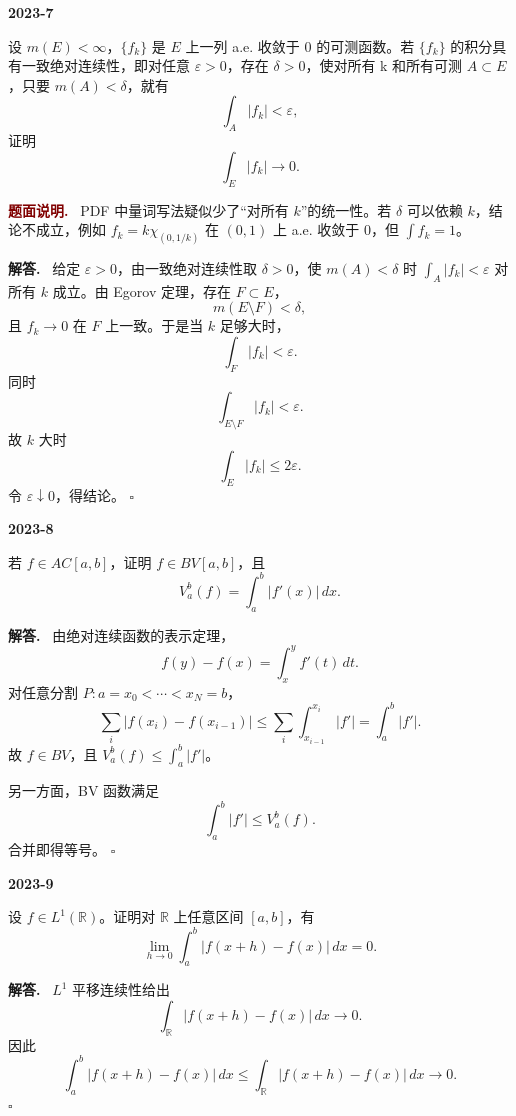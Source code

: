 \documentclass[UTF8]{ctexart}
\newcommand{\R}{\mathbb R}
\newcommand{\eps}{\varepsilon}
\newenvironment{problem}[1]{\par\medskip\noindent\textbf{#1}\par\smallskip}{\par}
\newenvironment{solution}{\par\noindent\textbf{解答.}\ }{\hfill$\square$\par\medskip}
\newenvironment{noteenv}{\par\noindent\textcolor{Maroon}{\textbf{题面说明.}}\ }{\par\smallskip}
\begin{document}
\begin{problem}{2023-7}
设 \(m(E)<\infty\)，\(\{f_k\}\) 是 \(E\) 上一列 a.e. 收敛于 \(0\) 的可测函数。若
\(\{f_k\}\) 的积分具有一致绝对连续性，即对任意 \(\eps>0\)，存在 \(\delta>0\)，使对所有
k 和所有可测 \(A\subset E\)，只要 \(m(A)<\delta\)，就有
\[
  \int_A |f_k|<\eps,
\]
证明
\[
  \int_E |f_k|\to0.
\]
\end{problem}
\begin{noteenv}
PDF 中量词写法疑似少了“对所有 \(k\)”的统一性。若 \(\delta\) 可以依赖 \(k\)，结论不成立，例如
\(f_k=k\chi_{(0,1/k)}\) 在 \((0,1)\) 上 a.e. 收敛于 \(0\)，但 \(\int f_k=1\)。
\end{noteenv}
\begin{solution}
给定 \(\eps>0\)，由一致绝对连续性取 \(\delta>0\)，使 \(m(A)<\delta\) 时
\(\int_A|f_k|<\eps\) 对所有 \(k\) 成立。由 Egorov 定理，存在 \(F\subset E\)，
\[
  m(E\setminus F)<\delta,
\]
且 \(f_k\to0\) 在 \(F\) 上一致。于是当 \(k\) 足够大时，
\[
  \int_F |f_k|<\eps.
\]
同时
\[
  \int_{E\setminus F}|f_k|<\eps.
\]
故 \(k\) 大时
\[
  \int_E |f_k|\le 2\eps.
\]
令 \(\eps\downarrow0\)，得结论。
\end{solution}

\begin{problem}{2023-8}
若 \(f\in AC[a,b]\)，证明 \(f\in BV[a,b]\)，且
\[
  V_a^b(f)=\int_a^b |f'(x)|\,dx.
\]
\end{problem}
\begin{solution}
由绝对连续函数的表示定理，
\[
  f(y)-f(x)=\int_x^y f'(t)\,dt.
\]
对任意分割 \(P:a=x_0<\cdots<x_N=b\)，
\[
  \sum_i|f(x_i)-f(x_{i-1})|
  \le \sum_i\int_{x_{i-1}}^{x_i}|f'|
  =\int_a^b|f'|.
\]
故 \(f\in BV\)，且 \(V_a^b(f)\le\int_a^b|f'|\)。

另一方面，BV 函数满足
\[
  \int_a^b|f'|\le V_a^b(f).
\]
合并即得等号。
\end{solution}

\begin{problem}{2023-9}
设 \(f\in L^1(\R)\)。证明对 \(\R\) 上任意区间 \([a,b]\)，有
\[
  \lim_{h\to0}\int_a^b |f(x+h)-f(x)|\,dx=0.
\]
\end{problem}
\begin{solution}
\(L^1\) 平移连续性给出
\[
  \int_\R |f(x+h)-f(x)|\,dx\to0.
\]
因此
\[
  \int_a^b |f(x+h)-f(x)|\,dx
  \le \int_\R |f(x+h)-f(x)|\,dx\to0.
\]
\end{solution}
\end{document}

